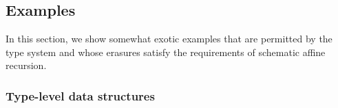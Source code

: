 \documentclass{article}
\begin{document}
\subsection{Examples}

In this section, we show somewhat exotic examples that are permitted
by the type system and whose erasures satisfy the requirements
of schematic affine recursion.

\subsubsection{Type-level data structures}



 
\end{document}
